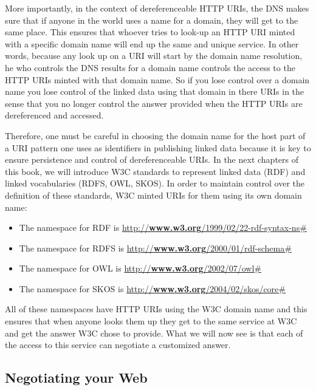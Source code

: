 More importantly, in the context of dereferenceable HTTP URIs, the DNS
makes sure that if anyone in the world uses a name for a domain, they
will get to the same place. This ensures that whoever tries to look-up
an HTTP URI minted with a specific domain name will end up the same and
unique service. In other words, because any look up on a URI will start
by the domain name resolution, he who controls the DNS results for a
domain name controls the access to the HTTP URIs minted with that domain
name. So if you lose control over a domain name you lose control of the
linked data using that domain in there URIs in the sense that you no
longer control the answer provided when the HTTP URIs are dereferenced
and accessed.

Therefore, one must be careful in choosing the domain name for the host
part of a URI pattern one uses as identifiers in publishing linked data
because it is key to ensure persistence and control of dereferenceable
URIs. In the next chapters of this book, we will introduce W3C standards
to represent linked data (RDF) and linked vocabularies (RDFS, OWL,
SKOS). In order to maintain control over the definition of these
standards, W3C minted URIs for them using its own domain name:

\begin{itemize}
\item
  The namespace for RDF is
  \href{http://www.w3.org/1999/02/22-rdf-syntax-ns\#}{http://\textbf{www.w3.org}/1999/02/22-rdf-syntax-ns\#}
\item
  The namespace for RDFS is
  \href{http://www.w3.org/2000/01/rdf-schema\#}{http://\textbf{www.w3.org}/2000/01/rdf-schema\#}
\item
  The namespace for OWL is
  \href{http://www.w3.org/2002/07/owl\#}{http://\textbf{www.w3.org}/2002/07/owl\#}
\item
  The namespace for SKOS is
  \href{http://www.w3.org/2004/02/skos/core\#}{http://\textbf{www.w3.org}/2004/02/skos/core\#}
\end{itemize}

All of these namespaces have HTTP URIs using the W3C domain name and
this ensures that when anyone looks them up they get to the same service
at W3C and get the answer W3C chose to provide. What we will now see is
that each of the access to this service can negotiate a customized
answer.

\hypertarget{negotiating-your-web}{%
\subsection{Negotiating your Web}\label{negotiating-your-web}}

